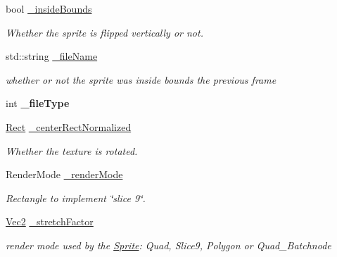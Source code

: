 \begin{DoxyCompactItemize}
\mbox{\label{classSprite_a0b41d5db3093e9e47071085453c188e5}} 
bool \hyperlink{classSprite_a0b41d5db3093e9e47071085453c188e5}{\+\_\+inside\+Bounds}
\begin{DoxyCompactList}\small\item\em Whether the sprite is flipped vertically or not. \end{DoxyCompactList}\item 
\mbox{\label{classSprite_accb8594a1a0003b0af9e9d0fd83ec968}} 
std\+::string \hyperlink{classSprite_accb8594a1a0003b0af9e9d0fd83ec968}{\+\_\+file\+Name}
\begin{DoxyCompactList}\small\item\em whether or not the sprite was inside bounds the previous frame \end{DoxyCompactList}\item 
\mbox{\label{classSprite_a774655ae7b4a2b84afae0640511a661f}} 
int {\bfseries \+\_\+file\+Type}
\item 
\mbox{\label{classSprite_a549d98850a1c2c79f5019a96309d61f9}} 
\hyperlink{classRect}{Rect} \hyperlink{classSprite_a549d98850a1c2c79f5019a96309d61f9}{\+\_\+center\+Rect\+Normalized}
\begin{DoxyCompactList}\small\item\em Whether the texture is rotated. \end{DoxyCompactList}\item 
\mbox{\label{classSprite_aee3c6f7306970f5ca285e0b6a4242ecf}} 
Render\+Mode \hyperlink{classSprite_aee3c6f7306970f5ca285e0b6a4242ecf}{\+\_\+render\+Mode}
\begin{DoxyCompactList}\small\item\em Rectangle to implement \char`\"{}slice 9\char`\"{}. \end{DoxyCompactList}\item 
\mbox{\label{classSprite_a67be5ac1bcb3f4b84d95b9116f6128d9}} 
\hyperlink{classVec2}{Vec2} \hyperlink{classSprite_a67be5ac1bcb3f4b84d95b9116f6128d9}{\+\_\+stretch\+Factor}
\begin{DoxyCompactList}\small\item\em render mode used by the \hyperlink{classSprite}{Sprite}\+: Quad, Slice9, Polygon or Quad\+\_\+\+Batchnode \end{DoxyCompactList}\item 

\end{DoxyCompactItemize}
